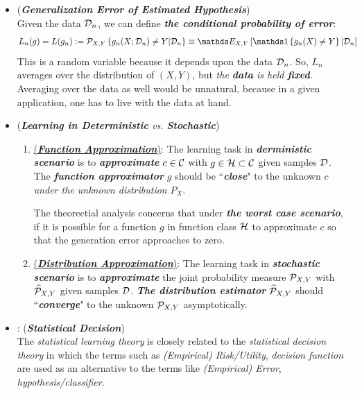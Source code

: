 \documentclass[11pt]{article}
\begin{document}
\begin{itemize}
\item \begin{definition} (\emph{\textbf{Generalization Error of Estimated Hypothesis}})  \citep{devroye2013probabilistic} \\
Given the data ${\mathcal D}_n$, we can define \emph{\textbf{the conditional probability of error}}:
\begin{align}
L_n(g) &= L(g_n) := \cP_{X, Y}\set{g_n(X; \cD_n) \neq Y | \cD_n}\equiv \E{X, Y}{\ind{g_n(X)\neq Y} | \cD_{n}} \label{expr: gen_err_estimator}
\end{align}  This is a random variable because it depends upon the data ${\mathcal D}_n$. So, $L_n$ averages over the distribution of $(X, Y)$, but \emph{the \textbf{data} is held \textbf{fixed}}. Averaging over the data as well would be unnatural, because in a given application, one has to live with the data at hand.  %
\end{definition}

\item \begin{remark} (\emph{\textbf{Learning in Deterministic} vs. \textbf{Stochastic}})
\begin{enumerate}
\item \underline{(\textbf{\emph{Function Approximation}})}: The learning task in \emph{\textbf{derministic scenario}} is to \emph{\textbf{approximate}} $c \in {\mathcal C}$ with $g \in {\mathcal H} \subset {\mathcal C}$ given samples ${\mathcal D}$. The \emph{\textbf{function approximator}} $g$ should be ``\emph{\textbf{close}}" to the unknown $c$ \emph{under the unknown distribution} $P_{X}$.

The theorectial analysis concerns that under \emph{\textbf{the worst case scenario}}, if it is possible for a function $g$ in function class ${\mathcal H}$ to approximate $c$ so that the generation error approaches to zero.

\item \underline{(\textbf{\emph{Distribution Approximation}})}: The learning task in \emph{\textbf{stochastic scenario}} is to \emph{\textbf{approximate}} the joint probability measure ${\mathcal P}_{X, Y}$ with $\widehat{{\mathcal P}}_{X, Y}$ given samples ${\mathcal D}$. \emph{\textbf{The distribution estimator}} $\widehat{{\mathcal P}}_{X, Y}$ should ``\emph{\textbf{converge}}" to the unknown ${\mathcal P}_{X, Y}$ asymptotically. 
\end{enumerate}
\end{remark}


\item \begin{remark}: (\emph{\textbf{Statistical Decision}}) \citep{berger2013statistical}\\
The \emph{statistical learning theory} is closely related to the \emph{statistical decision theory} in which the terms such as  \emph{(Empirical) Risk/Utility}, \emph{decision function} are used as an alternative to the terms like \emph{(Empirical) Error}, \emph{hypothesis/classifier}. 
\end{remark}
\end{itemize}
\end{document}
